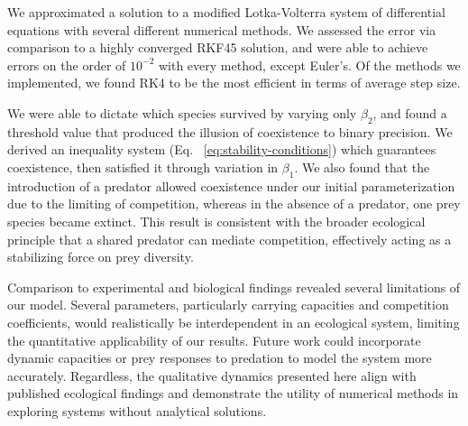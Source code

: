 We approximated a solution to a modified Lotka-Volterra system of differential equations with several different numerical methods. We assessed the error via comparison to a highly converged RKF45 solution, and were able to achieve errors on the order of $10^{-2}$ with every method, except Euler's. Of the methods we implemented, we found RK4 to be the most efficient in terms of average step size. 

We were able to dictate which species survived by varying only $\beta_2$, and found a threshold value that produced the illusion of coexistence to binary precision. We derived an inequality system (Eq. ~\ref{eq:stability-conditions}) which guarantees coexistence, then satisfied it through variation in $\beta_1$. We also found that the introduction of a predator allowed coexistence under our initial parameterization due to the limiting of competition, whereas in the absence of a predator, one prey species became extinct. This result is consistent with the broader ecological principle that a shared predator can mediate competition, effectively acting as a stabilizing force on prey diversity.

Comparison to experimental and biological findings revealed several limitations of our model. Several parameters, particularly carrying capacities and competition coefficients, would realistically be interdependent in an ecological system, limiting the quantitative applicability of our results.
Future work could incorporate dynamic capacities or prey responses to predation to model the system more accurately. 
Regardless, the qualitative dynamics presented here align with published ecological findings and demonstrate the utility of numerical methods in exploring systems without analytical solutions. 